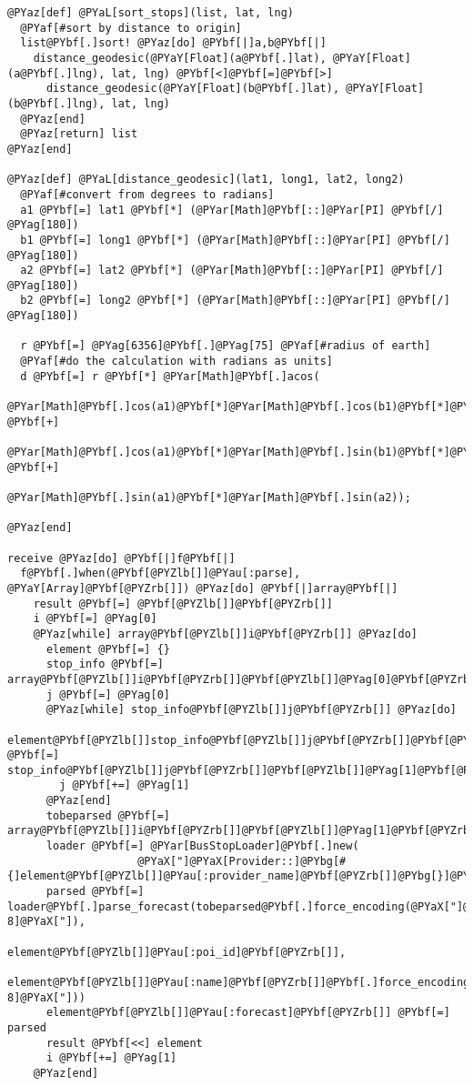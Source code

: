 \begin{Verbatim}[commandchars=@\[\]]
@PYaz[def] @PYaL[sort_stops](list, lat, lng)
  @PYaf[#sort by distance to origin]
  list@PYbf[.]sort! @PYaz[do] @PYbf[|]a,b@PYbf[|]
    distance_geodesic(@PYaY[Float](a@PYbf[.]lat), @PYaY[Float](a@PYbf[.]lng), lat, lng) @PYbf[<]@PYbf[=]@PYbf[>]
      distance_geodesic(@PYaY[Float](b@PYbf[.]lat), @PYaY[Float](b@PYbf[.]lng), lat, lng)
  @PYaz[end]
  @PYaz[return] list
@PYaz[end]

@PYaz[def] @PYaL[distance_geodesic](lat1, long1, lat2, long2)
  @PYaf[#convert from degrees to radians]
  a1 @PYbf[=] lat1 @PYbf[*] (@PYar[Math]@PYbf[::]@PYar[PI] @PYbf[/] @PYag[180])
  b1 @PYbf[=] long1 @PYbf[*] (@PYar[Math]@PYbf[::]@PYar[PI] @PYbf[/] @PYag[180])
  a2 @PYbf[=] lat2 @PYbf[*] (@PYar[Math]@PYbf[::]@PYar[PI] @PYbf[/] @PYag[180])
  b2 @PYbf[=] long2 @PYbf[*] (@PYar[Math]@PYbf[::]@PYar[PI] @PYbf[/] @PYag[180])

  r @PYbf[=] @PYag[6356]@PYbf[.]@PYag[75] @PYaf[#radius of earth]
  @PYaf[#do the calculation with radians as units]
  d @PYbf[=] r @PYbf[*] @PYar[Math]@PYbf[.]acos(
            @PYar[Math]@PYbf[.]cos(a1)@PYbf[*]@PYar[Math]@PYbf[.]cos(b1)@PYbf[*]@PYar[Math]@PYbf[.]cos(a2)@PYbf[*]@PYar[Math]@PYbf[.]cos(b2) @PYbf[+]
            @PYar[Math]@PYbf[.]cos(a1)@PYbf[*]@PYar[Math]@PYbf[.]sin(b1)@PYbf[*]@PYar[Math]@PYbf[.]cos(a2)@PYbf[*]@PYar[Math]@PYbf[.]sin(b2) @PYbf[+]
            @PYar[Math]@PYbf[.]sin(a1)@PYbf[*]@PYar[Math]@PYbf[.]sin(a2));
  
@PYaz[end]

receive @PYaz[do] @PYbf[|]f@PYbf[|]
  f@PYbf[.]when(@PYbf[@PYZlb[]]@PYau[:parse], @PYaY[Array]@PYbf[@PYZrb[]]) @PYaz[do] @PYbf[|]array@PYbf[|]
    result @PYbf[=] @PYbf[@PYZlb[]]@PYbf[@PYZrb[]]
    i @PYbf[=] @PYag[0]
    @PYaz[while] array@PYbf[@PYZlb[]]i@PYbf[@PYZrb[]] @PYaz[do]
      element @PYbf[=] {}
      stop_info @PYbf[=] array@PYbf[@PYZlb[]]i@PYbf[@PYZrb[]]@PYbf[@PYZlb[]]@PYag[0]@PYbf[@PYZrb[]]
      j @PYbf[=] @PYag[0]
      @PYaz[while] stop_info@PYbf[@PYZlb[]]j@PYbf[@PYZrb[]] @PYaz[do]
        element@PYbf[@PYZlb[]]stop_info@PYbf[@PYZlb[]]j@PYbf[@PYZrb[]]@PYbf[@PYZlb[]]@PYag[0]@PYbf[@PYZrb[]]@PYbf[.]to_sym@PYbf[@PYZrb[]] @PYbf[=] stop_info@PYbf[@PYZlb[]]j@PYbf[@PYZrb[]]@PYbf[@PYZlb[]]@PYag[1]@PYbf[@PYZrb[]]
        j @PYbf[+=] @PYag[1]
      @PYaz[end]
      tobeparsed @PYbf[=] array@PYbf[@PYZlb[]]i@PYbf[@PYZrb[]]@PYbf[@PYZlb[]]@PYag[1]@PYbf[@PYZrb[]]
      loader @PYbf[=] @PYar[BusStopLoader]@PYbf[.]new(
                    @PYaX["]@PYaX[Provider::]@PYbg[#{]element@PYbf[@PYZlb[]]@PYau[:provider_name]@PYbf[@PYZrb[]]@PYbg[}]@PYaX["]@PYbf[.]constantize)
      parsed @PYbf[=] loader@PYbf[.]parse_forecast(tobeparsed@PYbf[.]force_encoding(@PYaX["]@PYaX[UTF-8]@PYaX["]),
                                                       element@PYbf[@PYZlb[]]@PYau[:poi_id]@PYbf[@PYZrb[]],
                                  element@PYbf[@PYZlb[]]@PYau[:name]@PYbf[@PYZrb[]]@PYbf[.]force_encoding(@PYaX["]@PYaX[UTF-8]@PYaX["]))
      element@PYbf[@PYZlb[]]@PYau[:forecast]@PYbf[@PYZrb[]] @PYbf[=] parsed
      result @PYbf[<<] element
      i @PYbf[+=] @PYag[1]
    @PYaz[end]
    

\end{Verbatim}
